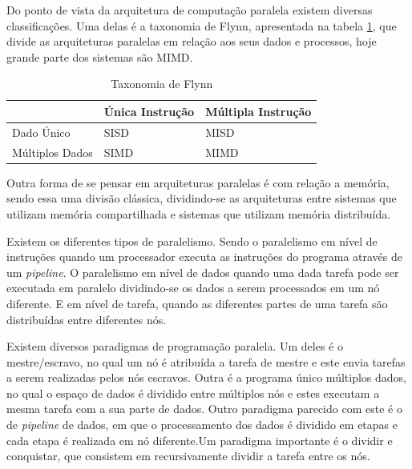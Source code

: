 \documentclass{ufsc-thesis}
\begin{document}
Do ponto de vista da arquitetura de computação paralela existem diversas classificações. 
Uma delas é a taxonomia de Flynn\cite{Flynn1972}, apresentada na tabela \ref{tab:flynn}, que divide as arquiteturas 
paralelas em relação aos seus dados e processos, hoje grande parte dos sistemas são MIMD. 

\begin{table}[H]
\begin{center}
\begin{tabular}{|l|l|l|}
\hline
                & Única Instrução & Múltipla Instrução \\ \hline
Dado Único      & SISD            & MISD               \\ \hline
Múltiplos Dados & SIMD            & MIMD               \\ \hline
\end{tabular}
\caption{Taxonomia de Flynn}\label{tab:flynn}
\end{center}
\end{table}

Outra forma de se pensar em arquiteturas paralelas é com relação a memória, sendo essa 
uma divisão clássica, dividindo-se as arquiteturas entre sistemas que utilizam memória 
compartilhada e sistemas que utilizam memória distribuída\cite{patterson2012computer}.

Existem os diferentes tipos de paralelismo. Sendo o paralelismo em nível de instruções 
quando um processador executa as instruções do programa através de um \textit{pipeline}\cite{patterson2012computer}.
O paralelismo em nível de dados quando uma dada tarefa pode ser executada em paralelo 
dividindo-se os dados a serem processados em um nó diferente\cite{Hillis1986}. E em nível de tarefa, quando 
as diferentes partes de uma tarefa são distribuídas entre diferentes nós\cite{Quinn2003}.

Existem diversos paradigmas de programação paralela\cite{Kumar2002}. Um deles é o mestre/escravo, no qual 
um nó é atribuída a tarefa de mestre e este envia tarefas a serem realizadas pelos nós 
escravos. Outra é a programa único múltiplos dados, no qual o espaço de dados é dividido 
entre múltiplos nós e estes executam a mesma tarefa com a sua parte de dados. Outro paradigma 
parecido com este é o de \textit{pipeline} de dados, em que o processamento dos dados é dividido 
em etapas e cada etapa é realizada em nó diferente.Um paradigma importante é o dividir e 
conquistar, que consistem em recursivamente dividir a tarefa entre os nós.
\end{document}
